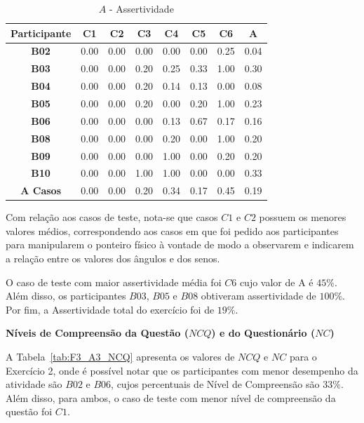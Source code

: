 \begin{table}[htbp]
	\centering
	\caption{$A$ - Assertividade}
	\begin{tabular}{|c|c|c|c|c|c|c|c|}
		\hline
		\rowcolor[HTML]{D9D9D9} 
		\textbf{Participante} & \textbf{C1} & \textbf{C2} & \textbf{C3} & \textbf{C4} & \textbf{C5} & \textbf{C6} & \textbf{A} \\ \hline
		\textbf{B02} & 0.00 & 0.00 & 0.00 & 0.00 & 0.00 & 0.25 & 0.04 \\ \hline
		\rowcolor[HTML]{D9D9D9} 
		\textbf{B03} & 0.00 & 0.00 & 0.20 & 0.25 & 0.33 & 1.00 & 0.30 \\ \hline
		\textbf{B04} & 0.00 & 0.00 & 0.20 & 0.14 & 0.13 & 0.00 & 0.08 \\ \hline
		\rowcolor[HTML]{D9D9D9} 
		\textbf{B05} & 0.00 & 0.00 & 0.20 & 0.00 & 0.20 & 1.00 & 0.23 \\ \hline
		\textbf{B06} & 0.00 & 0.00 & 0.00 & 0.13 & 0.67 & 0.17 & 0.16 \\ \hline
		\rowcolor[HTML]{D9D9D9} 
		\textbf{B08} & 0.00 & 0.00 & 0.00 & 0.20 & 0.00 & 1.00 & 0.20 \\ \hline
		\textbf{B09} & 0.00 & 0.00 & 0.00 & 1.00 & 0.00 & 0.20 & 0.20 \\ \hline
		\rowcolor[HTML]{D9D9D9} 
		\textbf{B10} & 0.00 & 0.00 & 1.00 & 1.00 & 0.00 & 0.00 & 0.33 \\ \hline
		\textbf{A Casos} & 0.00 & 0.00 & 0.20 & 0.34 & 0.17 & 0.45 & 0.19 \\ \hline
	\end{tabular}
	\label{tab:F3_A3_A}
\end{table}

Com relação aos casos de teste, nota-se que casos $C1$ e $C2$ possuem os menores valores médios, correspondendo aos casos em que foi pedido aos participantes para manipularem o ponteiro físico à vontade de modo a observarem e indicarem a relação entre os valores dos ângulos e dos senos. 

O caso de teste com maior assertividade média foi $C6$ cujo valor de A é $45\%$. Além disso, os participantes $B03$, $B05$ e $B08$ obtiveram assertividade de $100\%$. Por fim, a Assertividade total do exercício foi de $19\%$.

\textbf{Níveis de Compreensão da Questão ($NCQ$) e do Questionário ($NC$)}

A Tabela~\ref{tab:F3_A3_NCQ} apresenta os valores de $NCQ$ e $NC$ para o Exercício 2, onde é possível notar que os participantes com menor desempenho da atividade são $B02$ e $B06$, cujos percentuais de Nível de Compreensão são $33\%$. Além disso, para ambos, o caso de teste com menor nível de compreensão da questão foi $C1$.

